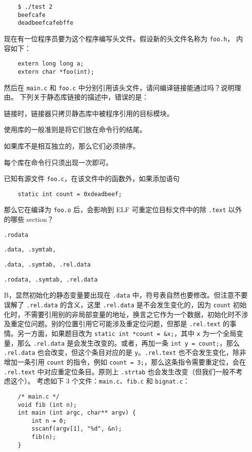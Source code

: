 \begin{problems}
\begin{verbatim}
    $ ./test 2
    beefcafe
    deadbeefcafebffe
        \end{verbatim}
        \qn 现在有一位程序员要为这个程序编写头文件。假设新的头文件名称为 \verb|foo.h|， 内容如下：
        \begin{verbatim}
    extern long long a;
    extern char *foo(int);
        \end{verbatim}
        然后在 \verb|main.c| 和 \verb|foo.c| 中分别引用该头文件，请问编译链接能通过吗？说明理由。
         下列关于静态库链接的描述中，错误的是：
        \begin{choices}
            \item 链接时，链接器只拷贝静态库中被程序引用的目标模块。
            \item 使用库的一般准则是将它们放在命令行的结尾。
            \item 如果库不是相互独立的，那么它们必须排序。
            \item 每个库在命令行只须出现一次即可。
        \end{choices}
         已知有源文件 \verb|foo.c|，在该文件中的函数外，如果添加语句
        \begin{verbatim}
    static int count = 0xdeadbeef;
        \end{verbatim}
        那么它在编译为 \verb|foo.o| 后，会影响到 ELF 可重定位目标文件中的除 \verb|.text| 以外的哪些 section？
        \begin{choices}
            \item \verb|.rodata|
            \item \verb|.data, .symtab,|
            \item \verb|.data, .symtab, .rel.data|
            \item \verb|.rodata, .symtab, .rel.data|
        \end{choices}
        \sol B，显然初始化的静态变量要出现在 \verb|.data| 中，符号表自然也要修改。但注意不要误解了 \verb|.rel.data| 的含义，这里 \verb|.rel.data| 是不会发生变化的，因为 \verb|count| 初始化时，不需要引用别的非局部变量的地址，换言之它作为一个数据，初始化时不涉及重定位问题。别的位置引用它可能涉及重定位问题，但那是 \verb|.rel.text| 的事情。另一方面，如果题目改为 \verb|static int *count = &x;|，其中 \verb|x| 为一个全局变量，那么 \verb|.rel.data| 是会发生改变的。或者，再加一条 \verb|int y = count;|，那么 \verb|.rel.data| 也会改变，但这个条目对应的是 \verb|y|。\verb|.rel.text| 也不会发生变化，除非增加一条引用 \verb|count| 的指令，例如 \verb|count = 3;|，那么这条指令需要重定位，会在 \verb|.rel.text| 中对应重定位条目。原则上 \verb|.strtab| 也会发生改变（但我们一般不考虑这个）。
         考虑如下 3 个文件：\verb|main.c|、\verb|fib.c| 和 \verb|bignat.c|：
        \begin{verbatim}
    /* main.c */
    void fib (int n);
    int main (int argc, char** argv) {
        int n = 0;
        sscanf(argv[1], "%d", &n);
        fib(n);
    }


\end{verbatim}
\end{problems}
